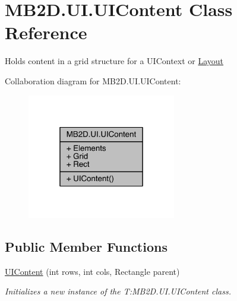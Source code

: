 \hypertarget{class_m_b2_d_1_1_u_i_1_1_u_i_content}{}\section{M\+B2\+D.\+U\+I.\+U\+I\+Content Class Reference}
\label{class_m_b2_d_1_1_u_i_1_1_u_i_content}


Holds content in a grid structure for a U\+I\+Context or \hyperlink{class_m_b2_d_1_1_u_i_1_1_layout}{Layout}  




Collaboration diagram for M\+B2\+D.\+U\+I.\+U\+I\+Content\+:
\nopagebreak
\begin{figure}[H]
\begin{center}
\leavevmode
\includegraphics[width=184pt]{class_m_b2_d_1_1_u_i_1_1_u_i_content__coll__graph}
\end{center}
\end{figure}
\subsection*{Public Member Functions}
\begin{DoxyCompactItemize}
\item 
\hyperlink{class_m_b2_d_1_1_u_i_1_1_u_i_content_a80e7f519af0f835fa9912ffa49d76e48}{U\+I\+Content} (int rows, int cols, Rectangle parent)
\begin{DoxyCompactList}\small\item\em Initializes a new instance of the T\+:\+M\+B2\+D.\+U\+I.\+U\+I\+Content class. \end{DoxyCompactList}\end{DoxyCompactItemize}
